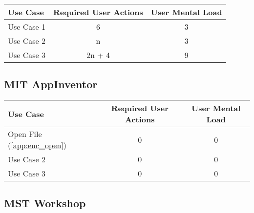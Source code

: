 \begin{tabularx}{\textwidth}{Xcc}
\textbf{Use Case} & \textbf{Required User Actions} & \textbf{User Mental Load}\\
\hline
Use Case 1                          & 6 & 3 \\
Use Case 2                          & n & 3 \\
Use Case 3                          & 2n + 4 & 9
\end{tabularx}

\subsection*{MIT AppInventor}

\begin{tabularx}{\textwidth}{Xcc}
\textbf{Use Case} & \textbf{Required User Actions} & \textbf{User Mental Load}\\
\hline
Open File (\ref{app:euc_open}) & 0 & 0 \\
Use Case 2                     & 0 & 0 \\
Use Case 3                     & 0 & 0
\end{tabularx}

\subsection*{MST Workshop}




